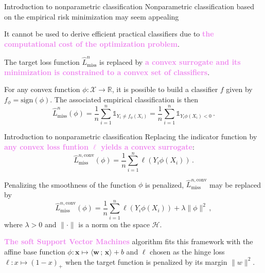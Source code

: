 \documentclass[9pt]{beamer}
\newcommand{\bw}{\textbf{w}}
\newcommand{\eqsp}{\,}
\newcommand{\bx}{\textbf{x}}
\begin{document}
\begin{frame}{Introduction to nonparametric classification}
Nonparametric classification based on the empirical risk minimization may seem appealing  

It cannot be used to derive efficient practical classifiers due to \textcolor{violet}{{\bf the computational cost of the optimization problem}}. 

The target loss function $\widehat L^n_{\mathrm{miss}}$ is replaced by \textcolor{violet}{{\bf a convex surrogate and its minimization is constrained to a convex set of classifiers}}.

\vspace{.3cm}

For any convex function $\phi:\mathcal{X}\to \mathbb{R}$, it is possible to build a classifier $f$ given by $f_\phi=\mathrm{sign}(\phi)$. The associated empirical classification is then
\[
\widehat L^n_{\mathrm{miss}}(\phi) = \frac{1}{n}\sum_{i=1}^n \mathds{1}_{Y_i \neq f_\phi(X_i)} = \frac{1}{n}\sum_{i=1}^n \mathds{1}_{Y_i\phi(X_i) <0}\,.
\]
\end{frame}

\begin{frame}{Introduction to nonparametric classification}
Replacing the indicator function by \textcolor{violet}{{\bf any convex loss funtion $\ell$ yields a convex surrogate}}:
\[
\widehat L^{n,\mathrm{conv}}_{\mathrm{miss}}(\phi) = \frac{1}{n}\sum_{i=1}^n \ell(Y_i\phi(X_i))\eqsp.
\]

\vspace{.3cm}

Penalizing the smoothness of the function $\phi$ is penalized, $\widehat L^{n,\mathrm{conv}}_{\mathrm{miss}}$ may be  replaced by 
\[
\widehat L^{n,\mathrm{conv}}_{\mathrm{miss}}(\phi) = \frac{1}{n}\sum_{i=1}^n \ell(Y_i\phi(X_i)) + \lambda\|\phi\|^2\,,
\]
where $\lambda>0$ and $\|\cdot\|$ is a norm on the space $\mathcal{H}$. 

\vspace{.3cm}

\textcolor{violet}{{\bf The soft Support Vector Machines}} algorithm fits this framework with the affine base function $\phi:\bx\mapsto \langle \bw\eqsp;\eqsp \bx\rangle + b$ and $\ell$ chosen as the hinge loss $\ell: x \mapsto (1-x)_+$ when the target function is penalized by its margin $\|w\|^2$.

\end{frame}
\end{document}
